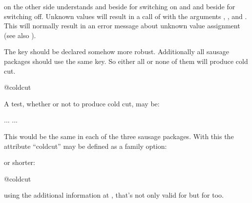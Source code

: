  on the other side understands  
and  beside  for switching on and  and
 beside  for switching off. Unknown values will result
in a call of  with the arguments ,
, and . This will normally result in an error message
about unknown value assignment (see also
).
\begin{Example}
  The key  should be declared somehow more robust. Additionally
  all sausage packages should use the same key. So either all or none of them
  will produce cold cut.
\begin{lstcode}
                         {@coldcut}
\end{lstcode}
  A test, whether or not to produce cold cut, may be:
\begin{lstcode}
  \if@coldcut
     ...
  \else
     ...
  \fi
\end{lstcode}
  This would be the same in each of the three sausage packages. With this the
  attribute ``coldcut'' may be defined as a family option:
  or shorter:
\begin{lstcode}
                           {@coldcut}
\end{lstcode}
  using the additional information at
  , that's not only valid
  for  but for  too.
\end{Example}
%
%


